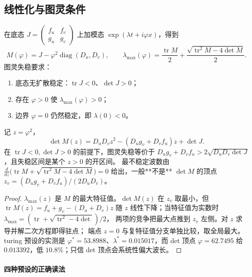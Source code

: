 \subsection{线性化与图灵条件}

在底态 $J=\begin{pmatrix}f_u&f_v\\g_u&g_v\end{pmatrix}$ 上加模态
$\exp(\lambda t+i\varphi x)$，得到
\[
  M(\varphi)=J-\varphi^2\operatorname{diag}(D_u,D_v),\qquad
  \lambda_{\max}(\varphi)=\frac{\operatorname{tr}M}
  {2}+\frac{\sqrt{\operatorname{tr}^2M-4\det M}}{2}.
\]
图灵失稳要求：
\begin{enumerate}
  \item 底态无扩散稳定：$\operatorname{tr}J<0$、$\det J>0$；
  \item 存在 $\varphi>0$ 使 $\lambda_{\max}(\varphi)>0$；
  \item 边界 $\varphi=0$ 仍然稳定，即 $\lambda(0)<0$。
\end{enumerate}

\begin{theorem}[图灵带与最不稳定波数]\label{thm:turing}
记 $z=\varphi^2$，
\[
  \det M(z)=D_uD_vz^2-(D_ug_v+D_vf_u)z+\det J .
\]
在 $\operatorname{tr}J<0,\det J>0$ 的前提下，图灵失稳等价于
$D_ug_v+D_vf_u>2\sqrt{D_uD_v\det J}$，且失稳区间是某个 $z>0$ 的开区间。
最不稳定波数由
$\frac{d}{dz}\bigl(\operatorname{tr}M+\sqrt{\operatorname{tr}^2M-4\det M}\bigr)=0$
给出，一般**不是** $\det M$ 的顶点
$z_v=(D_ug_v+D_vf_u)/(2D_uD_v)$。
\end{theorem}

\begin{proof}
$\lambda_{\max}(z)$ 是 $M$ 的最大特征值。$\det M(z)$ 在 $z_v$ 取最小，但
$\operatorname{tr}M(z)=f_u+g_v-(D_u+D_v)z$ 随 $z$ 线性下降；当特征值为实数时
$\lambda_{\max}=(\operatorname{tr}+\sqrt{\operatorname{tr}^2-4\det})/2$，
两项的竞争把最大点推到 $z_v$ 左侧。对 $z$ 求导并解二次方程即得驻点；
端点 $z=0$ 与复特征值分支单独比较，取全局最大。turing 预设的实测是
$\varphi^\ast=53.8988$、$\lambda^\ast=0.015017$，而 det 顶点 $\varphi=62.7495$
给 $0.013392$，低 $10.8\%$；只信 det 顶点会系统性偏大波长。
\end{proof}

\paragraph{四种预设的正确读法}

